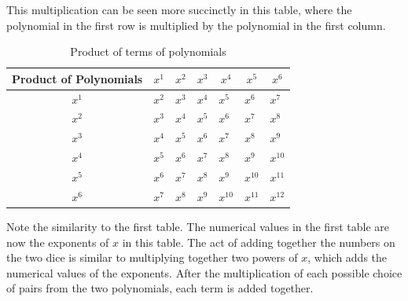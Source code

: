 \documentclass[12pt]{article}
\begin{document}
This multiplication can be seen more succinctly in this table, where the polynomial in the first row is multiplied by the polynomial in the first column.
\begin{table}[H]
\centering
\begin{tabular}{|c|l|l|l|l|l|l|}
\hline
Product of Polynomials & \multicolumn{1}{c|}{$x^1$} & \multicolumn{1}{c|}{$x^2$} & \multicolumn{1}{c|}{$x^3$} & \multicolumn{1}{c|}{$x^4$} & \multicolumn{1}{c|}{$x^5$} & \multicolumn{1}{c|}{$x^6$} \\ \hline
$x^1$                  & $x^{2}$                    & $x^{3}$                    & $x^{4}$                    & $x^{5}$                    & $x^{6}$                    & $x^{7}$                    \\ \hline
$x^2$                  & $x^{3}$                    & $x^{4}$                    & $x^{5}$                    & $x^{6}$                    & $x^{7}$                    & $x^{8}$                    \\ \hline
$x^3$                  & $x^{4}$                    & $x^{5}$                    & $x^{6}$                    & $x^{7}$                    & $x^{8}$                    & $x^{9}$                    \\ \hline
$x^4$                  & $x^{5}$                    & $x^{6}$                    & $x^{7}$                    & $x^{8}$                    & $x^{9}$                    & $x^{10}$                   \\ \hline
$x^5$                  & $x^{6}$                    & $x^{7}$                    & $x^{8}$                    & $x^{9}$                    & $x^{10}$                   & $x^{11}$                   \\ \hline
$x^6$                  & $x^{7}$                    & $x^{8}$                    & $x^{9}$                    & $x^{10}$                   & $x^{11}$                   & $x^{12}$                   \\ \hline
\end{tabular}
\caption{Product of terms of polynomials}
\end{table}
Note the similarity to the first table. The numerical values in the first table are now the exponents of $x$ in this table. The act of adding together the numbers on the two dice is similar to multiplying together two powers of $x$, which adds the numerical values of the exponents. After the multiplication of each possible choice of pairs from the two polynomials, each term is added together.
\end{document}
